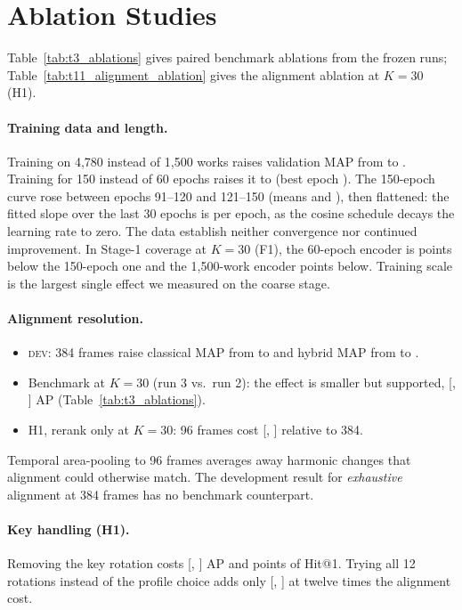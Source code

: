 \documentclass[10pt]{article}
\newcommand{\tier}[1]{\textsc{#1}}
\begin{document}
\section{Ablation Studies}\label{sec:ablations}
Table~\ref{tab:t3_ablations} gives paired benchmark ablations from the frozen runs; Table~\ref{tab:t11_alignment_ablation} gives the alignment ablation at $K=30$ (H1).

\paragraph{Training data and length.} Training on 4{,}780 instead of 1{,}500 works raises validation MAP from \ValSmall{} to \ValFull{}. Training for 150 instead of 60 epochs raises it to \ValLong{} (best epoch \ValLongBestEpoch).
The 150-epoch curve rose between epochs 91--120 and 121--150 (means \ValMeanNinetyOne{} and \ValMeanOneTwentyOne), then flattened: the fitted slope over the last 30 epochs is \ValLongSlope{} per epoch, as the cosine schedule decays the learning rate to zero. The data establish neither convergence nor continued improvement.
In Stage-1 coverage at $K=30$ (F1), the 60-epoch encoder is \FOneSixtyThirty{} points below the 150-epoch one and the 1{,}500-work encoder \FOneSmallThirty{} points below. Training scale is the largest single effect we measured on the coarse stage.

\paragraph{Alignment resolution.}
\begin{itemize}
\item \tier{dev}: 384 frames raise classical MAP from \DevClassicalLow{} to \DevClassicalHigh{} and hybrid MAP from \DevHybLow{} to \DevHybHigh.
\item Benchmark at $K=30$ (run 3 vs.\ run 2): the effect is smaller but supported, \ResGain{} [\ResGainLo, \ResGainHi] AP (Table~\ref{tab:t3_ablations}).
\item H1, rerank only at $K=30$: 96 frames cost \HOneShortAp{} [\HOneShortApLo, \HOneShortApHi] relative to 384.
\end{itemize}
Temporal area-pooling to 96 frames averages away harmonic changes that alignment could otherwise match. The development result for \emph{exhaustive} alignment at 384 frames has no benchmark counterpart.

\paragraph{Key handling (H1).} Removing the key rotation costs \HOneNoRotAp{} [\HOneNoRotApLo, \HOneNoRotApHi] AP and \HOneNoRotHit{} points of Hit@1. Trying all 12 rotations instead of the profile choice adds only \HOneExhAp{} [\HOneExhApLo, \HOneExhApHi] at twelve times the alignment cost.
\end{document}
